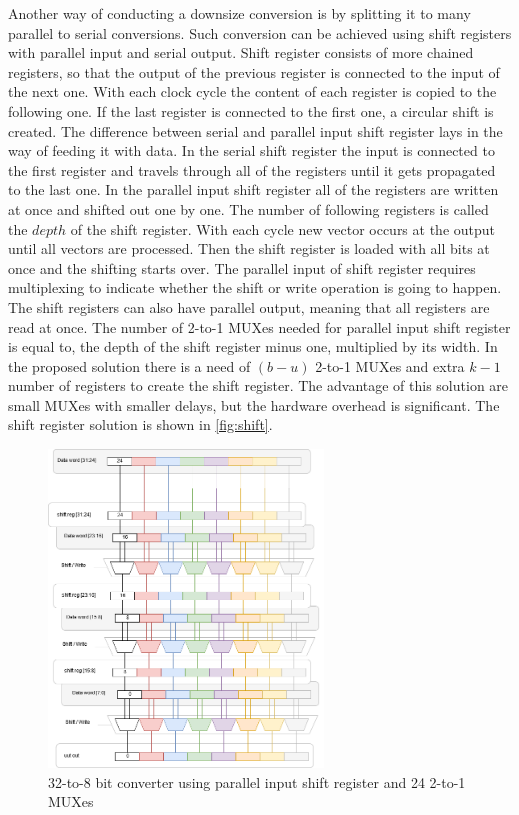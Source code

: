 Another way of conducting a downsize conversion is by splitting it to many parallel to serial conversions. Such conversion can be achieved using shift registers with parallel input and serial output. Shift register consists of more chained registers, so that the output of the previous register is connected to the input of the next one. With each clock cycle the content of each register is copied to the following one. If the last register is connected to the first one, a circular shift is created. The difference between serial and parallel input shift register lays in the way of feeding it with data. In the serial shift register the input is connected to the first register and travels through all of the registers until it gets propagated to the last one. In the parallel input shift register all of the registers are written at once and shifted out one by one. The number of following registers is called the $depth$ of the shift register. With each cycle new vector occurs at the output until all vectors are processed. Then the shift register is loaded with all bits at once and the shifting starts over. The parallel input of shift register requires multiplexing to indicate whether the shift or write operation is going to happen. The shift registers can also have parallel output, meaning that all registers are read at once. The number of 2-to-1 MUXes needed for parallel input shift register is equal to, the depth of the shift register minus one, multiplied by its width. In the proposed solution there is a need of $(b-u)$ 2-to-1 MUXes and extra $k-1$ number of registers to create the shift register. The advantage of this solution are small MUXes with smaller delays, but the hardware overhead is significant. The shift register solution is shown in \autoref{fig:shift}.

\begin{figure}[h]
\centering
\includegraphics[width=0.65\textwidth]{figures/Shift_2.png}
\caption{32-to-8 bit converter using parallel input shift register and 24 2-to-1 MUXes}
\label{fig:shift}
\end{figure}

